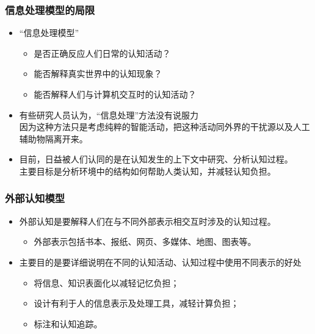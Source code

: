 \documentclass{beamer}
\begin{document}
\begin{frame}
	\frametitle{信息处理模型的局限}
	\beamertemplatetransparentcovereddynamicmedium
	\transwipe
	\begin{itemize}
		\item “信息处理模型”
		\begin{itemize}
			\item 是否正确反应人们日常的认知活动？ 
			\item 能否解释真实世界中的认知现象？
			\item 能否解释人们与计算机交互时的认知活动？
		\end{itemize}\pause
		\item 有些研究人员认为，``信息处理''方法没有说服力\\{\tiny 因为这种方法只是考虑纯粹的智能活动，把这种活动同外界的干扰源以及人工辅助物隔离开来。}\pause
		\item 目前，日益被人们认同的是在认知发生的上下文中研究、分析认知过程。\\{\tiny 主要目标是分析环境中的结构如何帮助人类认知，并减轻认知负担。}
	\end{itemize}
\end{frame}

\begin{frame}
	\frametitle{外部认知模型}
	\beamertemplatetransparentcovereddynamicmedium
	\transwipe
	\begin{itemize}
		\item 外部认知是要解释人们在与不同外部表示相交互时涉及的认知过程。
		\begin{itemize}
			\item 外部表示包括书本、报纸、网页、多媒体、地图、图表等。
		\end{itemize}\pause
		\item 主要目的是要详细说明在不同的认知活动、认知过程中使用不同表示的好处
		\begin{itemize}
			\item 将信息、知识表面化以减轻记忆负担；
			\item 设计有利于人的信息表示及处理工具，减轻计算负担；
			\item 标注和认知追踪。
		\end{itemize}
	\end{itemize}
\end{frame}

{
\frame[plain]{\transdissolve}
}
\end{document}
